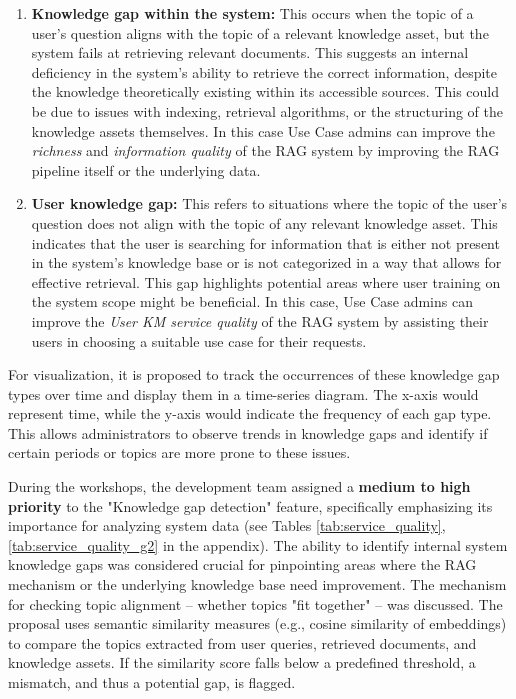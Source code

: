 \documentclass[
	english,
	ruledheaders=section,%
	class=report,%
	thesis={type=bachelor},%
	accentcolor=1b,%
	custommargins=true,%
	marginpar=false,%
	parskip=half-,%
	fontsize=11pt,%
	DIV=14,
]{tudapub}
\begin{document}
\begin{enumerate}
    \item \textbf{Knowledge gap within the system:} This occurs when the topic of a user's question aligns with the topic of a relevant knowledge asset, but the system fails at retrieving relevant documents. This suggests an internal deficiency in the system's ability to retrieve the correct information, despite the knowledge theoretically existing within its accessible sources. This could be due to issues with indexing, retrieval algorithms, or the structuring of the knowledge assets themselves. In this case Use Case admins can improve the \textit{richness} and \textit{information quality} \parencite[pp.~57--58]{DeloneMcLean2003ISSuccessTenYearUpdate} of the RAG system by improving the RAG pipeline itself or the underlying data.
    \item \textbf{User knowledge gap:} This refers to situations where the topic of the user's question does not align with the topic of any relevant knowledge asset. This indicates that the user is searching for information that is either not present in the system's knowledge base or is not categorized in a way that allows for effective retrieval. This gap highlights potential areas where user training on the system scope might be beneficial. In this case, Use Case admins can improve the \textit{User KM service quality} \parencite[pp.~58--59]{DeloneMcLean2003ISSuccessTenYearUpdate} of the RAG system by assisting their users in choosing a suitable use case for their requests.
\end{enumerate}

For visualization, it is proposed to track the occurrences of these knowledge gap types over time and display them in a time-series diagram. The x-axis would represent time, while the y-axis would indicate the frequency of each gap type. This allows administrators to observe trends in knowledge gaps and identify if certain periods or topics are more prone to these issues.

During the workshops, the development team assigned a \textbf{medium to high priority} to the "Knowledge gap detection" feature, specifically emphasizing its importance for analyzing system data (see Tables \ref{tab:service_quality}, \ref{tab:service_quality_g2} in the appendix). The ability to identify internal system knowledge gaps was considered crucial for pinpointing areas where the RAG mechanism or the underlying knowledge base need improvement. The mechanism for checking topic alignment -- whether topics "fit together" -- was discussed. The proposal uses semantic similarity measures (e.g., cosine similarity of embeddings) to compare the topics extracted from user queries, retrieved documents, and knowledge assets. If the similarity score falls below a predefined threshold, a mismatch, and thus a potential gap, is flagged.
\end{document}
